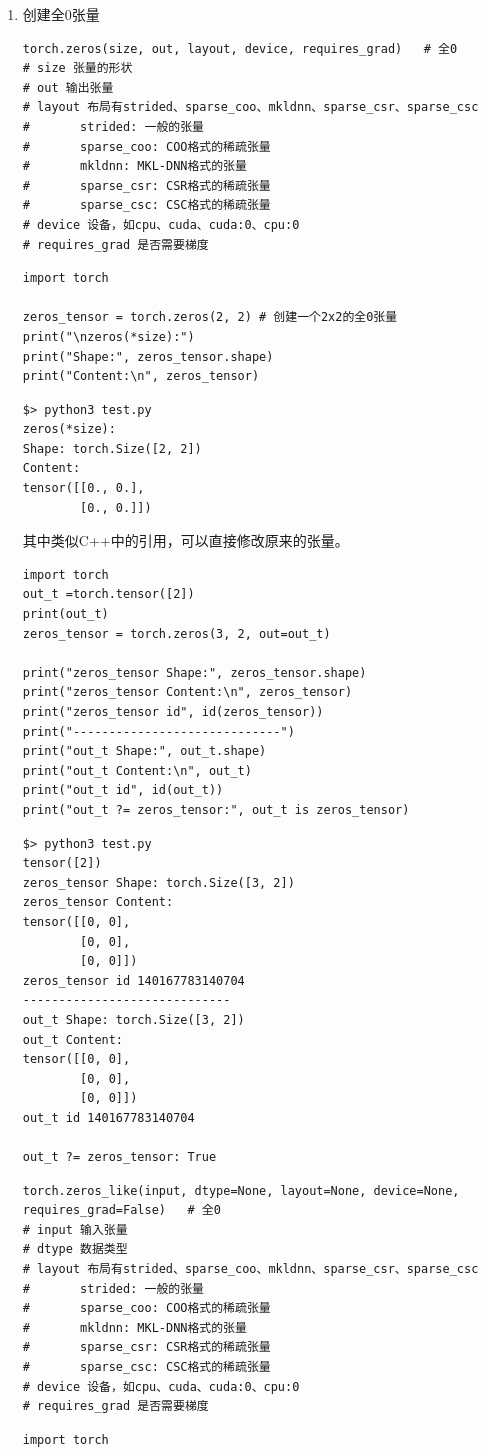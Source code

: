 \begin{enumerate}[label=\arabic*)]
\item 创建全0张量
\begin{lstlisting}[style=demostyle,numbers=none]
torch.zeros(size, out, layout, device, requires_grad)   # 全0
# size 张量的形状
# out 输出张量
# layout 布局有strided、sparse_coo、mkldnn、sparse_csr、sparse_csc        
#       strided: 一般的张量
#       sparse_coo: COO格式的稀疏张量
#       mkldnn: MKL-DNN格式的张量
#       sparse_csr: CSR格式的稀疏张量
#       sparse_csc: CSC格式的稀疏张量
# device 设备，如cpu、cuda、cuda:0、cpu:0
# requires_grad 是否需要梯度
\end{lstlisting}
\begin{lstlisting}[style=pythonstyle]
import torch

zeros_tensor = torch.zeros(2, 2) # 创建一个2x2的全0张量
print("\nzeros(*size):")
print("Shape:", zeros_tensor.shape)
print("Content:\n", zeros_tensor)
\end{lstlisting}
\begin{lstlisting}[style=demostyle,numbers=none]
$> python3 test.py
zeros(*size):
Shape: torch.Size([2, 2])
Content:
tensor([[0., 0.],
        [0., 0.]])
\end{lstlisting}

其中类似C++中的引用，可以直接修改原来的张量。
\begin{lstlisting}[style=pythonstyle]
import torch
out_t =torch.tensor([2])
print(out_t)
zeros_tensor = torch.zeros(3, 2, out=out_t)

print("zeros_tensor Shape:", zeros_tensor.shape)
print("zeros_tensor Content:\n", zeros_tensor)
print("zeros_tensor id", id(zeros_tensor))
print("-----------------------------")
print("out_t Shape:", out_t.shape)
print("out_t Content:\n", out_t)
print("out_t id", id(out_t))
print("out_t ?= zeros_tensor:", out_t is zeros_tensor)
\end{lstlisting}
\begin{lstlisting}[style=demostyle,numbers=none]
$> python3 test.py
tensor([2])
zeros_tensor Shape: torch.Size([3, 2])
zeros_tensor Content:
tensor([[0, 0],
        [0, 0],
        [0, 0]])
zeros_tensor id 140167783140704
-----------------------------
out_t Shape: torch.Size([3, 2])
out_t Content:
tensor([[0, 0],
        [0, 0],
        [0, 0]])
out_t id 140167783140704

out_t ?= zeros_tensor: True
\end{lstlisting}  
\begin{lstlisting}[style=demostyle,numbers=none]
torch.zeros_like(input, dtype=None, layout=None, device=None, requires_grad=False)   # 全0
# input 输入张量
# dtype 数据类型
# layout 布局有strided、sparse_coo、mkldnn、sparse_csr、sparse_csc        
#       strided: 一般的张量
#       sparse_coo: COO格式的稀疏张量
#       mkldnn: MKL-DNN格式的张量
#       sparse_csr: CSR格式的稀疏张量
#       sparse_csc: CSC格式的稀疏张量
# device 设备，如cpu、cuda、cuda:0、cpu:0
# requires_grad 是否需要梯度
\end{lstlisting}       
\begin{lstlisting}[style=pythonstyle]
import torch


\end{lstlisting}
\end{enumerate}
